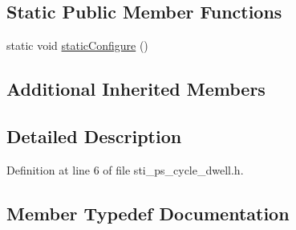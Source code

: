 \subsection*{Static Public Member Functions}
\begin{DoxyCompactItemize}
\item 
static void \hyperlink{structsm__respira__1_1_1ps__cycle__inner__states_1_1StiPSCycleDwell_af642d65faee889b5bf5b2ad6bd48fedc}{static\+Configure} ()
\end{DoxyCompactItemize}
\subsection*{Additional Inherited Members}


\subsection{Detailed Description}


Definition at line 6 of file sti\+\_\+ps\+\_\+cycle\+\_\+dwell.\+h.



\subsection{Member Typedef Documentation}
\mbox{\label{structsm__respira__1_1_1ps__cycle__inner__states_1_1StiPSCycleDwell_a71868ecd28a6aa6501a318a72207c2b5}} 

